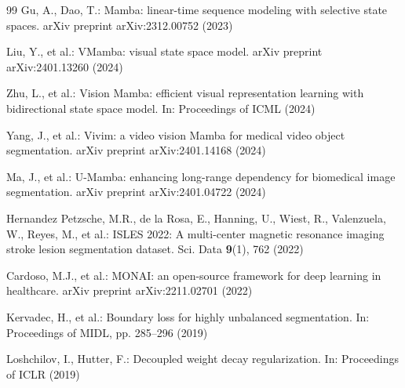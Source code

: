 \documentclass[pdflatex,sn-mathphys-num]{sn-jnl}
\begin{document}
\begin{thebibliography}{99}
Gu, A., Dao, T.: Mamba: linear-time sequence modeling with selective state spaces. arXiv preprint arXiv:2312.00752 (2023)

Liu, Y., et al.: VMamba: visual state space model. arXiv preprint arXiv:2401.13260 (2024)

Zhu, L., et al.: Vision Mamba: efficient visual representation learning with bidirectional state space model. In: Proceedings of ICML (2024)

Yang, J., et al.: Vivim: a video vision Mamba for medical video object segmentation. arXiv preprint arXiv:2401.14168 (2024)

Ma, J., et al.: U-Mamba: enhancing long-range dependency for biomedical image segmentation. arXiv preprint arXiv:2401.04722 (2024)

Hernandez Petzsche, M.R., de la Rosa, E., Hanning, U., Wiest, R., Valenzuela, W., Reyes, M., et al.: ISLES 2022: A multi-center magnetic resonance imaging stroke lesion segmentation dataset. Sci. Data \textbf{9}(1), 762 (2022)

Cardoso, M.J., et al.: MONAI: an open-source framework for deep learning in healthcare. arXiv preprint arXiv:2211.02701 (2022)

Kervadec, H., et al.: Boundary loss for highly unbalanced segmentation. In: Proceedings of MIDL, pp. 285--296 (2019)

Loshchilov, I., Hutter, F.: Decoupled weight decay regularization. In: Proceedings of ICLR (2019)

\end{thebibliography}
\end{document}
